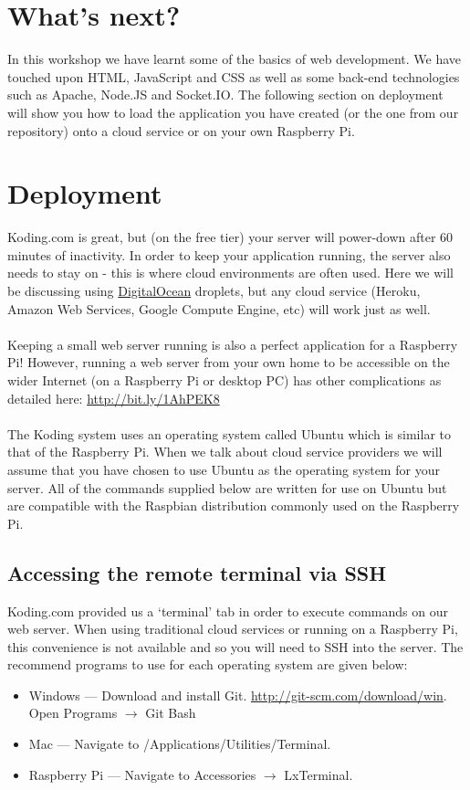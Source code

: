 \documentclass[twocolumn]{article}
\begin{document}
\section{What's next?}

In this workshop we have learnt some of the basics of web development. We have touched upon HTML, JavaScript and CSS as well as some back-end technologies such as Apache, Node.JS and Socket.IO. The following section on deployment will show you how to load the application you have created (or the one from our repository) onto a cloud service or on your own Raspberry Pi.

\section{Deployment}
Koding.com is great, but (on the free tier) your server will power-down after 60 minutes of inactivity. In order to keep your application running, the server also needs to stay on - this is where cloud environments are often used. Here we will be discussing using \href{http://digitalocean.com}{DigitalOcean} droplets, but any cloud service (Heroku, Amazon Web Services, Google Compute Engine, etc) will work just as well.\\
\\
Keeping a small web server running is also a perfect application for a Raspberry Pi! However, running a web server from your own home to be accessible on the wider Internet (on a Raspberry Pi or desktop PC) has other complications as detailed here: \url{http://bit.ly/1AhPEK8}\\
\\
The Koding system uses an operating system called Ubuntu which is similar to that of the Raspberry Pi. When we talk about cloud service providers we will assume that you have chosen to use Ubuntu as the operating system for your server. All of the commands supplied below are written for use on Ubuntu but are compatible with the Raspbian distribution commonly used on the Raspberry Pi.

\subsection{Accessing the remote terminal via SSH}
\label{sec:terminal}

Koding.com provided us a `terminal' tab in order to execute commands on our web server. When using traditional cloud services or running on a Raspberry Pi, this convenience is not available and so you will need to SSH into the server. The recommend programs to use for each operating system are given below:
\begin{itemize}
\item Windows --- Download and install Git. \url{http://git-scm.com/download/win}. Open Programs $\rightarrow$ Git Bash
\item Mac --- Navigate to /Applications/Utilities/Terminal.
\item Raspberry Pi --- Navigate to Accessories $\rightarrow$ LxTerminal.
\end{itemize}
\end{document}
